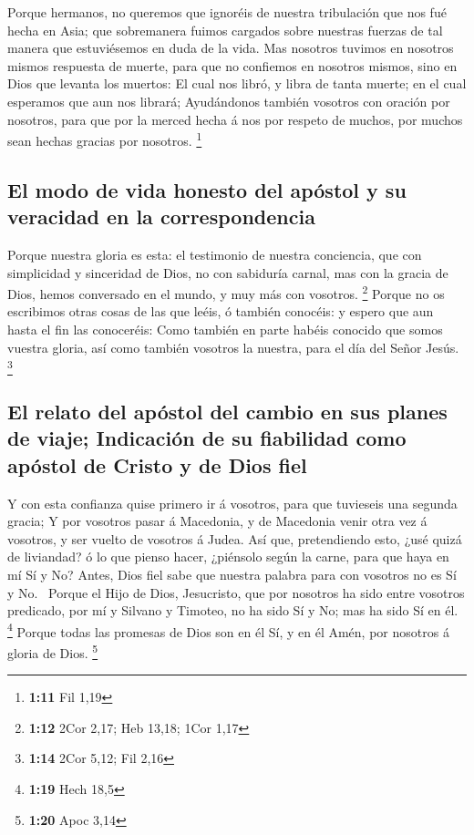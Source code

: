  Porque hermanos, no queremos que ignoréis de nuestra
tribulación que nos fué hecha en Asia; que sobremanera fuimos cargados
sobre nuestras fuerzas de tal manera que estuviésemos en duda de la
vida.  Mas nosotros tuvimos en nosotros mismos respuesta de
muerte, para que no confiemos en nosotros mismos, sino en Dios que
levanta los muertos:  El cual nos libró, y libra de tanta
muerte; en el cual esperamos que aun nos librará; 
Ayudándonos también vosotros con oración por nosotros, para que por la
merced hecha á nos por respeto de muchos, por muchos sean hechas gracias
por nosotros. \footnote{\textbf{1:11} Fil 1,19}

\hypertarget{el-modo-de-vida-honesto-del-apuxf3stol-y-su-veracidad-en-la-correspondencia}{%
\subsection{El modo de vida honesto del apóstol y su veracidad en la
correspondencia}\label{el-modo-de-vida-honesto-del-apuxf3stol-y-su-veracidad-en-la-correspondencia}}

 Porque nuestra gloria es esta: el testimonio de nuestra
conciencia, que con simplicidad y sinceridad de Dios, no con sabiduría
carnal, mas con la gracia de Dios, hemos conversado en el mundo, y muy
más con vosotros. \footnote{\textbf{1:12} 2Cor 2,17; Heb 13,18; 1Cor
  1,17}  Porque no os escribimos otras cosas de las que
leéis, ó también conocéis: y espero que aun hasta el fin las conoceréis:
 Como también en parte habéis conocido que somos vuestra
gloria, así como también vosotros la nuestra, para el día del Señor
Jesús. \footnote{\textbf{1:14} 2Cor 5,12; Fil 2,16}

\hypertarget{el-relato-del-apuxf3stol-del-cambio-en-sus-planes-de-viaje-indicaciuxf3n-de-su-fiabilidad-como-apuxf3stol-de-cristo-y-de-dios-fiel}{%
\subsection{El relato del apóstol del cambio en sus planes de viaje;
Indicación de su fiabilidad como apóstol de Cristo y de Dios
fiel}\label{el-relato-del-apuxf3stol-del-cambio-en-sus-planes-de-viaje-indicaciuxf3n-de-su-fiabilidad-como-apuxf3stol-de-cristo-y-de-dios-fiel}}

 Y con esta confianza quise primero ir á vosotros, para que
tuvieseis una segunda gracia;  Y por vosotros pasar á
Macedonia, y de Macedonia venir otra vez á vosotros, y ser vuelto de
vosotros á Judea.  Así que, pretendiendo esto, ¿usé quizá
de liviandad? ó lo que pienso hacer, ¿piénsolo según la carne, para que
haya en mí Sí y No?  Antes, Dios fiel sabe que nuestra
palabra para con vosotros no es Sí y No.~ Porque el Hijo de
Dios, Jesucristo, que por nosotros ha sido entre vosotros predicado, por
mí y Silvano y Timoteo, no ha sido Sí y No; mas ha sido Sí en él.
\footnote{\textbf{1:19} Hech 18,5}  Porque todas las
promesas de Dios son en él Sí, y en él Amén, por nosotros á gloria de
Dios. \footnote{\textbf{1:20} Apoc 3,14}

